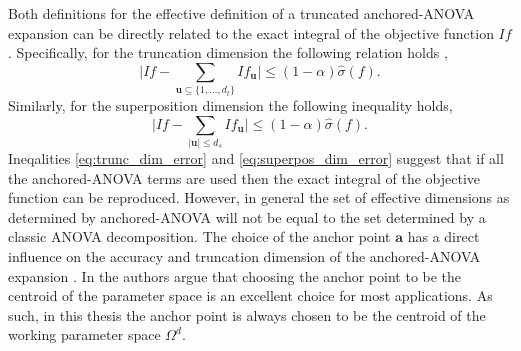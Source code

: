 Both definitions for the effective definition of a truncated anchored-\ac{ANOVA} expansion can be directly related to the exact integral of the objective function $If$. Specifically, for the truncation dimension the following relation holds \cite{Holtz},
\begin{equation} \label{eq:trunc_dim_error}
    \vert If -  
     \sum_{\textbf{u} \subseteq \lbrace 1,...,d_t\rbrace}
      If_\textbf{u} 
    \vert \leq \left(1-\alpha\right) \hat{\sigma}\left(f\right).
\end{equation}
Similarly, for the superposition dimension the following inequality holds,
\begin{equation} \label{eq:superpos_dim_error}
    \vert If -  
     \sum_{\vert \textbf{u} \vert \leq d_s}
      If_\textbf{u} 
    \vert \leq \left(1-\alpha\right) \hat{\sigma}\left(f\right).
\end{equation}
Ineqalities \ref{eq:trunc_dim_error} and \ref{eq:superpos_dim_error} suggest that if all the anchored-\ac{ANOVA} terms are used then the exact integral of the objective function can be reproduced. However, in general the set of effective dimensions as determined by anchored-\ac{ANOVA} will not be equal to the set determined by a classic \ac{ANOVA} decomposition. The choice of the anchor point $\textbf{a}$ has a direct influence on the accuracy and truncation dimension of the anchored-\ac{ANOVA} expansion \cite{Hesthaven_AnchorPoint}. In \cite{Hesthaven_AnchorPoint} the authors argue that choosing the anchor point to be the centroid of the parameter space is an excellent choice for most applications. As such, in this thesis the anchor point is always chosen to be the centroid of the working parameter space $\Omega^d$.    

